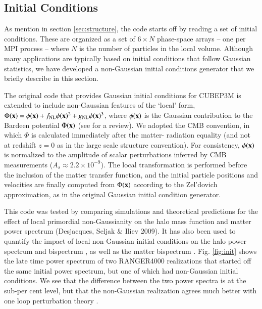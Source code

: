 \subsection{Initial Conditions}
\label{subsec:init}

As mention in section \ref{sec:structure}, the code starts off by reading a set of initial conditions.
These are organized as a set of $6 \times N$ phase-space arrays -- one per {\small MPI} process -- where $N$ is the number of particles in the
local volume. Although many applications are typically based on initial conditions that follow Gaussian statistics,
we have developed a non-Gaussian initial conditions generator that we briefly describe in this section. 


The original code that provides Gaussian initial conditions for {\small CUBEP3M} 
is extended to include non-Gaussian features of the `local' form,
$\Phi({\bf x})=\phi({\bf x})+f_{\rm NL} \phi({\bf x})^2 + g_{\rm NL} 
\phi({\bf x})^3$, where $\phi({\bf x})$ is the Gaussian contribution
to the Bardeen potential $\Phi({\bf x})$ (see \cite{2004PhR...402..103B} for a review). 
We adopted the CMB convention,
in which $\Phi$ is calculated immediately after the matter-
radiation equality (and not at redshift $z=0$ as in the large scale
structure convention). For consistency, $\phi({\bf x})$ is normalized
to the amplitude of scalar perturbations inferred by CMB measurements
($A_s\approx 2.2 \times 10^{-9}$). The local transformation is performed 
before the inclusion of the matter transfer function, and the initial 
particle positions and velocities are finally computed from $\Phi({\bf x})$ 
according to the Zel'dovich approximation, as in the original Gaussian initial condition generator.

This code was tested by comparing simulations and theoretical predictions
for the effect of local primordial non-Gaussianity on the halo mass 
function and matter power spectrum (Desjacques, Seljak \& Iliev 2009). 
It has also been used to quantify the impact of local non-Gaussian initial
conditions on the halo power spectrum \citep{2009MNRAS.396...85D,
2010PhRvD..81b3006D} and bispectrum \citep{2010MNRAS.406.1014S},
 as well as the matter bispectrum \citep{2011arXiv1111.6966S}.
Fig. \ref{fig:init} shows the late time power spectrum of two RANGER4000 realizations that started off the same initial power spectrum, 
but one of which had non-Gaussian initial conditions.
We see that the difference between the two power spectra is at the sub-per cent level, but that the non-Gaussian realization
agrees much better with one loop perturbation theory \citep{2004PhRvD..69j3513S,2008PhRvD..78l3534T}.

